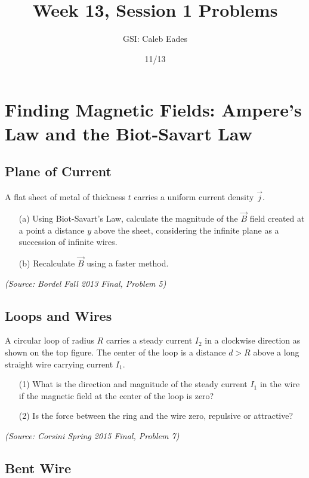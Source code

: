 \documentclass{article}
\begin{document}
\title{Week 13, Session 1 Problems}
\author{GSI: Caleb Eades}
\date{11/13}
\maketitle

\section{Finding Magnetic Fields: Ampere's Law and the Biot-Savart Law}

\subsection{Plane of Current}

A flat sheet of metal of thickness $t$ carries a uniform current density $\vec{j}$.
\begin{itemize}
\item[(a)] Using Biot-Savart's Law, calculate the magnitude of the $\vec{B}$ field created at a point a distance $y$ above the sheet, considering the infinite plane as a succession of infinite wires.
\item[(b)] Recalculate $\vec{B}$ using a faster method.
\end{itemize}

\textit{(Source: Bordel Fall 2013 Final, Problem 5)}

\subsection{Loops and Wires}

A circular loop of radius $R$ carries a steady current $I_2$ in a clockwise direction as shown on the top figure. The center of the loop is a distance $d>R$ above a long straight wire carrying current $I_1$.
\begin{itemize}
\item[(1)] What is the direction and magnitude of the steady current $I_1$ in the wire if the magnetic field at the center of the loop is zero?
\item[(2)] Is the force between the ring and the wire zero, repulsive or attractive?
\end{itemize}

\textit{(Source: Corsini Spring 2015 Final, Problem 7)}

\subsection{Bent Wire}
\end{document}
